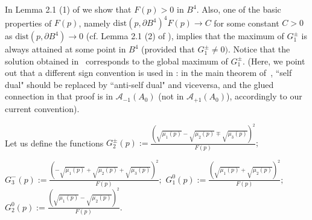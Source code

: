 \documentclass[11pt]{article}
\numberwithin{equation}{section} \setlength{\topmargin}{-35pt}
\begin{document}
In Lemma 2.1 (1) of \cite{IM2} we show that $F(p)>0$ in $B^4.$ Also,
one of the basic properties of $F(p)$, namely
$\text{dist}(p,\partial B^4)^4F(p)\to C$ for some constant $C>0$ as
$\text{dist}(p,\partial B^4)\to 0$ (cf.  Lemma 2.1 (2) of
\cite{IM2}), implies that the maximum of $G_1^{\pm}$ is always
attained at some point in $B^4$ (provided that $G^\pm_1\neq 0).$
Notice that the solution obtained in~\cite{IM} corresponds to the
global maximum of $G_1^{\pm}$. (Here, we point out that a different
sign convention is used in \cite{IM}: in the main theorem
of~\cite{IM}, ``self dual" should be replaced by ``anti-self dual"
and viceversa, and the glued connection in that proof is in
$\mathcal{A}_{-1}(A_0)$ (not in $\mathcal{A}_{+1}(A_0)$),
accordingly to our current convention).

\begin{theorem}
Let us define the functions
$G_2^\pm(p):=\frac{(\sqrt{\mu_1(p)}-\sqrt{\mu_2(p)}\mp\sqrt{\mu_3(p)})^2}{F(p)};$
\hfill

\noindent
$G_3^-(p):=\frac{(-\sqrt{\mu_1(p)}+\sqrt{\mu_2(p)}+\sqrt{\mu_3(p)})^2}{F(p)};$
$G_1^0(p):=\frac{(\sqrt{\mu_1(p)}+\sqrt{\mu_2(p)})^2}{F(p)};$
$G_2^0(p):=\frac{(\sqrt{\mu_1(p)}-\sqrt{\mu_2(p)})^2}{F(p)}.$


\end{theorem}
\end{document}

